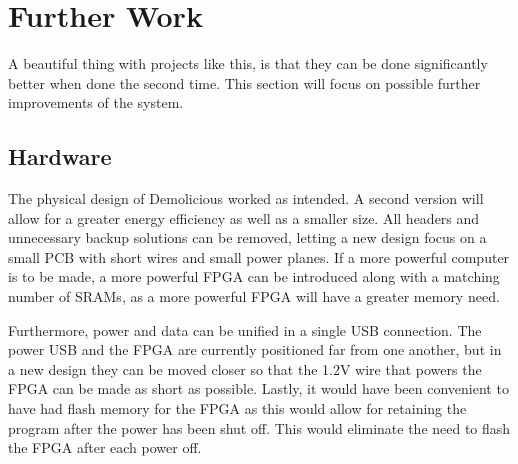 \documentclass[../main/report.tex]{subfiles}
\begin{document}
\section{Further Work}

A beautiful thing with projects like this, is that they can be done significantly better when done the second time.
This section will focus on possible further improvements of the system.

\subsection{Hardware}
The physical design of Demolicious worked as intended.
A second version will allow for a greater energy efficiency as well as a smaller size.
All headers and unnecessary backup solutions can be removed, letting a new design focus on a small PCB with short wires and small power planes.
If a more powerful computer is to be made, a more powerful FPGA can be introduced along with a matching number of SRAMs, as a more powerful FPGA will have a greater memory need.

Furthermore, power and data can be unified in a single USB connection.
The power USB and the FPGA are currently positioned far from one another, but in a new design they can be moved closer so that the 1.2V wire that powers the FPGA can be made as short as possible.
Lastly, it would have been convenient to have had flash memory for the FPGA as this would allow for retaining the program after the power has been shut off.
This would eliminate the need to flash the FPGA after each power off.
\end{document}
